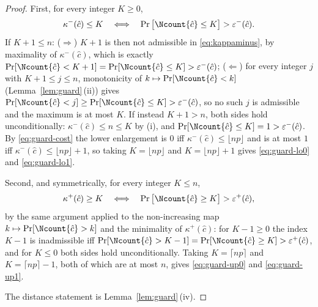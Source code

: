 \begin{proof}
First, for every integer $K\ge0$,
\begin{equation*}
  \kappa^{-}(\hat c)\le K
  \quad\Longleftrightarrow\quad
  \Pr\big[\Ncount{\hat c}\le K\big]>\varepsilon^{-}(\hat c).
\end{equation*}
If $K+1\le n$: ($\Rightarrow$) $K+1$ is then not admissible in
\eqref{eq:kappaminus}, by maximality of $\kappa^{-}(\hat c)$, which is exactly
$\Pr[\Ncount{\hat c}<K+1]=\Pr[\Ncount{\hat c}\le K]>\varepsilon^{-}(\hat c)$;
($\Leftarrow$) for every integer $j$ with $K+1\le j\le n$, monotonicity of
$k\mapsto\Pr[\Ncount{\hat c}<k]$ (Lemma~\ref{lem:guard}\,(ii)) gives
$\Pr[\Ncount{\hat c}<j]\ge\Pr[\Ncount{\hat c}\le K]>\varepsilon^{-}(\hat c)$,
so no such $j$ is admissible and the maximum is at most $K$. If instead
$K+1>n$, both sides hold unconditionally: $\kappa^{-}(\hat c)\le n\le K$ by
(i), and $\Pr[\Ncount{\hat c}\le K]=1>\varepsilon^{-}(\hat c)$.
By \eqref{eq:guard-cost} the lower enlargement is $0$ iff
$\kappa^{-}(\hat c)\le\lfloor np\rfloor$ and is at most $1$ iff
$\kappa^{-}(\hat c)\le\lfloor np\rfloor+1$, so taking $K=\lfloor np\rfloor$
and $K=\lfloor np\rfloor+1$ gives \eqref{eq:guard-lo0} and
\eqref{eq:guard-lo1}.

Second, and symmetrically, for every integer $K\le n$,
\begin{equation*}
  \kappa^{+}(\hat c)\ge K
  \quad\Longleftrightarrow\quad
  \Pr\big[\Ncount{\hat c}\ge K\big]>\varepsilon^{+}(\hat c),
\end{equation*}
by the same argument applied to the non-increasing map
$k\mapsto\Pr[\Ncount{\hat c}>k]$ and the minimality of $\kappa^{+}(\hat c)$:
for $K-1\ge0$ the index $K-1$ is inadmissible iff
$\Pr[\Ncount{\hat c}>K-1]=\Pr[\Ncount{\hat c}\ge K]>\varepsilon^{+}(\hat c)$,
and for $K\le0$ both sides hold unconditionally. Taking $K=\lceil np\rceil$
and $K=\lceil np\rceil-1$, both of which are at most $n$, gives
\eqref{eq:guard-up0} and \eqref{eq:guard-up1}.

The distance statement is Lemma~\ref{lem:guard}\,(iv).


\end{proof}
